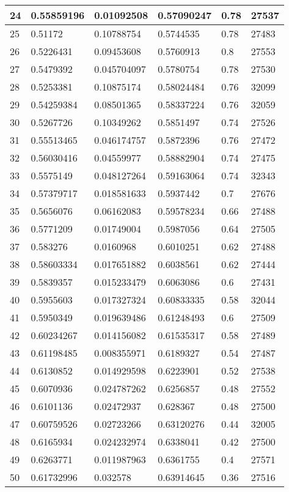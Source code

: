 \begin{longtable}{|l|l|l|l|l|l|}
24 & 0.55859196 & 0.01092508 & 0.57090247 & 0.78 & 27537 \\ \hline 
25 & 0.51172 & 0.10788754 & 0.5744535 & 0.78 & 27483 \\ \hline 
26 & 0.5226431 & 0.09453608 & 0.5760913 & 0.8 & 27553 \\ \hline 
27 & 0.5479392 & 0.045704097 & 0.5780754 & 0.78 & 27530 \\ \hline 
28 & 0.5253381 & 0.10875174 & 0.58024484 & 0.76 & 32099 \\ \hline 
29 & 0.54259384 & 0.08501365 & 0.58337224 & 0.76 & 32059 \\ \hline 
30 & 0.5267726 & 0.10349262 & 0.5851497 & 0.74 & 27526 \\ \hline 
31 & 0.55513465 & 0.046174757 & 0.5872396 & 0.76 & 27472 \\ \hline 
32 & 0.56030416 & 0.04559977 & 0.58882904 & 0.74 & 27475 \\ \hline 
33 & 0.5575149 & 0.048127264 & 0.59163064 & 0.74 & 32343 \\ \hline 
34 & 0.57379717 & 0.018581633 & 0.5937442 & 0.7 & 27676 \\ \hline 
35 & 0.5656076 & 0.06162083 & 0.59578234 & 0.66 & 27488 \\ \hline 
36 & 0.5771209 & 0.01749004 & 0.5987056 & 0.64 & 27505 \\ \hline 
37 & 0.583276 & 0.0160968 & 0.6010251 & 0.62 & 27488 \\ \hline 
38 & 0.58603334 & 0.017651882 & 0.6038561 & 0.62 & 27444 \\ \hline 
39 & 0.5839357 & 0.015233479 & 0.6063086 & 0.6 & 27431 \\ \hline 
40 & 0.5955603 & 0.017327324 & 0.60833335 & 0.58 & 32044 \\ \hline 
41 & 0.5950349 & 0.019639486 & 0.61248493 & 0.6 & 27509 \\ \hline 
42 & 0.60234267 & 0.014156082 & 0.61535317 & 0.58 & 27489 \\ \hline 
43 & 0.61198485 & 0.008355971 & 0.6189327 & 0.54 & 27487 \\ \hline 
44 & 0.6130852 & 0.014929598 & 0.6223901 & 0.52 & 27538 \\ \hline 
45 & 0.6070936 & 0.024787262 & 0.6256857 & 0.48 & 27552 \\ \hline 
46 & 0.6101136 & 0.02472937 & 0.628367 & 0.48 & 27500 \\ \hline 
47 & 0.60759526 & 0.02723266 & 0.63120276 & 0.44 & 32005 \\ \hline 
48 & 0.6165934 & 0.024232974 & 0.6338041 & 0.42 & 27500 \\ \hline 
49 & 0.6263771 & 0.011987963 & 0.6361755 & 0.4 & 27571 \\ \hline 
50 & 0.61732996 & 0.032578 & 0.63914645 & 0.36 & 27516 \\ \hline 
\end{longtable}